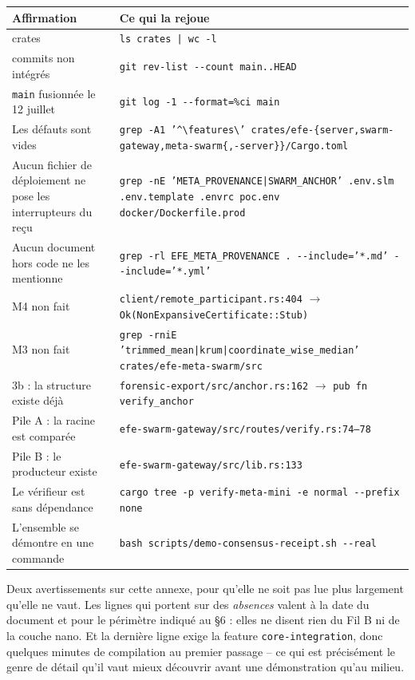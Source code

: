 \documentclass[10pt]{article}
\newcommand{\code}[1]{\texttt{\small #1}}
\begin{document}
\renewcommand{\arraystretch}{1.22}
\begin{center}\small
\begin{tabular}{@{}>{\raggedright\arraybackslash}p{5.05cm} >{\raggedright\arraybackslash}p{11.1cm}@{}}
\toprule
\textbf{Affirmation} & \textbf{Ce qui la rejoue} \\
\midrule
66 crates & \code{ls crates | wc -l} \\
31 commits non intégrés & \code{git rev-list -{}-count main..HEAD} \\
\code{main} fusionnée le 12 juillet & \code{git log -1 -{}-format=\%ci main} \\
Les défauts sont vides &
  \code{grep -A1 '\textasciicircum\textbackslash\lbrack features\textbackslash\rbrack' \newline
  crates/efe-\{server,swarm-gateway,meta-swarm\{,-server\}\}/Cargo.toml} \\
Aucun fichier de déploiement ne pose les interrupteurs du reçu &
  \code{grep -nE 'META\_PROVENANCE|SWARM\_ANCHOR' .env.slm .env.template .envrc poc.env docker/Dockerfile.prod} \\
Aucun document hors code ne les mentionne &
  \code{grep -rl EFE\_META\_PROVENANCE . -{}-include='*.md' -{}-include='*.yml'} \\
M4 non fait & \code{client/remote\_participant.rs:404} $\rightarrow$ \code{Ok(NonExpansiveCertificate::Stub)} \\
M3 non fait & \code{grep -rniE 'trimmed\_mean|krum|coordinate\_wise\_median' crates/efe-meta-swarm/src} \\
3b : la structure existe déjà & \code{forensic-export/src/anchor.rs:162} $\rightarrow$ \code{pub fn verify\_anchor} \\
Pile A : la racine est comparée & \code{efe-swarm-gateway/src/routes/verify.rs:74--78} \\
Pile B : le producteur existe & \code{efe-swarm-gateway/src/lib.rs:133} \\
Le vérifieur est sans dépendance & \code{cargo tree -p verify-meta-mini -e normal -{}-prefix none} \\
L'ensemble se démontre en une commande & \code{bash scripts/demo-consensus-receipt.sh -{}-real} \\
\bottomrule
\end{tabular}
\end{center}

Deux avertissements sur cette annexe, pour qu'elle ne soit pas lue plus largement qu'elle ne vaut. Les
lignes qui portent sur des \emph{absences} valent à la date du document et pour le périmètre indiqué au
§6 : elles ne disent rien du Fil B ni de la couche nano. Et la dernière ligne exige la feature
\code{core-integration}, donc quelques minutes de compilation au premier passage -- ce qui est
précisément le genre de détail qu'il vaut mieux découvrir avant une démonstration qu'au milieu.
\end{document}
